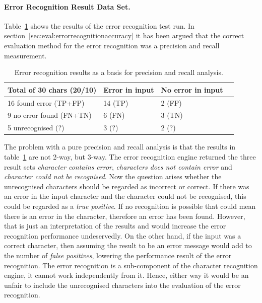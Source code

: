 \paragraph{Error Recognition Result Data Set.}
Table~\ref{table:eval:resultsprecisionandrecallnumbers} shows the results 
of the error recognition test run. 
In section~\ref{sec:eval:errorrecognitionaccuracy} it has been argued that the
correct evaluation method for the error recognition was a precision and recall
measurement.
\begin{table}[htbp]
\begin{center}
  \begin{tabular}{|l|l|l|p{200pt}|}
    \hline
    Total of 30 chars (20/10) & Error in input      & No error in input \\
    \hline
    16 found error (TP+FP)    & 14 (TP)             & 2 (FP) \\
    \hline
    9 no error found (FN+TN)  & 6 (FN)              & 3 (TN) \\
    \hline
    5 unrecognised (?)        & 3 (?)               & 2 (?) \\
    \hline
  \end{tabular}
\end{center}
\caption{Error recognition results as a basis for precision and recall analysis.}
\label{table:eval:resultsprecisionandrecallnumbers}
\end{table}
The problem with a pure precision and recall analysis is that the results
in table~\ref{table:eval:resultsprecisionandrecallnumbers} are not 2-way, 
but 3-way. The error recognition engine returned the three result sets 
\emph{character contains error}, \emph{characters does not contain error}
and \emph{character could not be recognised}.
Now the question arises whether the unrecognised characters should be 
regarded as incorrect or correct. 
If there was an error in the input character and the character could 
not be recognised, this could be regarded as a \emph{true positive}.
If no recognition is possible that could mean there is an error in 
the character, therefore an error has been found.
However, that is just an interpretation of the results and
would increase the error recognition performance undeservedly. 
On the other hand, if the input was a correct character,
then assuming the result to be an error message would add 
to the number of \emph{false positives}, 
lowering the performance result of the error recognition.
The error recognition is a sub-component of the character recognition engine,
it cannot work independently from it. 
Hence, either way it would be an unfair to include the unrecognised
characters into the evaluation of the error recognition.


